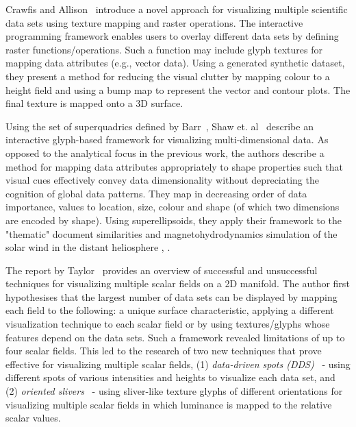 Crawfis and Allison~\cite{crawfis91} introduce a novel approach for visualizing multiple scientific data sets using texture mapping and raster operations. 
The interactive programming framework enables users to overlay different data sets by defining raster functions/operations. 
Such a function may include glyph textures for mapping data attributes (e.g., vector data).
Using a generated synthetic dataset, they present a method for reducing the visual clutter by mapping colour to a height field and using a bump map to represent the vector and contour plots. The final texture is mapped onto a 3D surface. 

Using the set of superquadrics defined by Barr~\cite{barr81}, Shaw et. al~\cite{shaw98} describe an interactive glyph-based framework for visualizing multi-dimensional data. 
As opposed to the analytical focus in the previous work, the authors describe a method for mapping data attributes appropriately to shape properties such that visual cues effectively convey data dimensionality without depreciating the cognition of global data patterns. They map in decreasing order of data importance, values to location, size, colour and shape (of which two dimensions are encoded by shape). Using superellipsoids, they apply their framework to the "thematic" document similarities \cite{shaw98} and magnetohydrodynamics simulation of the solar wind in the distant heliosphere \cite{ebert00}, \cite{ebert01}.

The report by Taylor~\cite{taylor02} provides an overview of successful and unsuccessful techniques for visualizing multiple scalar fields on a 2D manifold. 
The author first hypothesises that the largest number of data sets can be displayed by mapping each field to the following: a unique surface characteristic, applying a different visualization technique to each scalar field or by using textures/glyphs whose features depend on the data sets. Such a framework revealed limitations of up to four scalar fields.
This led to the research of two new techniques that prove effective for visualizing multiple scalar fields, (1) \emph{data-driven spots (DDS)}~\cite{bokinsky03dataDrivenSpots} - using different spots of various intensities and heights to visualize each data set, and (2) \emph{oriented slivers}~\cite{weigle00orientedSlivers} - using sliver-like texture glyphs of different orientations for visualizing multiple scalar fields in which luminance is mapped to the relative scalar values.

